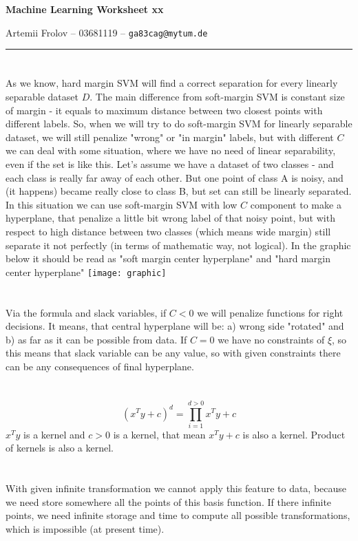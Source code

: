 \documentclass[11pt]{article}
\makeatletter
\newcommand{\exercise}{\section{}}
\newcommand{\hwhead}[4]{
\begin{center}
\sffamily\large\bfseries Machine Learning Worksheet #1
\vspace{2mm} 
\normalfont

#2 -- #3 -- \texttt{#4}
\end{center}
\vspace{6mm} \hrule \vspace{4mm}
}
\newcommand{\name}{Artemii Frolov} %
\newcommand{\imat}{03681119} %
\newcommand{\email}{ga83cag@mytum.de} %
\makeatother
\begin{document}
\hwhead{xx}{\name}{\imat}{\email}


\exercise %
As we know, hard margin SVM will find a correct separation for every linearly separable dataset $D$. The main difference from soft-margin SVM is constant size of margin - it equals to maximum distance between two closest points with different labels. So, when we will try to do soft-margin SVM for linearly separable dataset, we will still penalize "wrong" or "in margin" labels, but with different $C$ we can deal with some situation, where we have no need of linear separability, even if the set is like this. \newline
Let's assume we have a dataset of two classes - and each class is really far away of each other. But one point of class A is noisy, and (it happens) became really close to class B, but set can still be linearly separated. In this situation we can use soft-margin SVM with low $C$ component to make a hyperplane, that penalize a little bit wrong label of that noisy point, but with respect to high distance between two classes (which means wide margin) still separate it not perfectly (in terms of mathematic way, not logical). \newline
In the graphic below it should be read as "soft margin center hyperplane" and "hard margin center hyperplane"
\texttt{[image: graphic]}
\exercise
Via the formula and slack variables, if $C<0$ we will penalize functions for right decisions. It means, that central hyperplane will be: a) wrong side "rotated"  and b) as far as it can be possible from data. \newline
If $C=0$ we have no constraints of $\xi$, so this means that slack variable can be any value, so with given constraints there can be any consequences of final hyperplane.

\exercise
$$(x^Ty+c)^d = \prod_{i=1}^{d>0}x^Ty+c$$
$x^Ty$ is a kernel and $c>0$ is a kernel, that mean $x^Ty+c$ is also a kernel. Product of kernels is also a kernel.

\exercise
With given infinite transformation we cannot apply this feature to data, because we need store somewhere all the points of this basis function. If there infinite points, we need infinite storage and time to compute all possible transformations, which is impossible (at present time).
\end{document}
